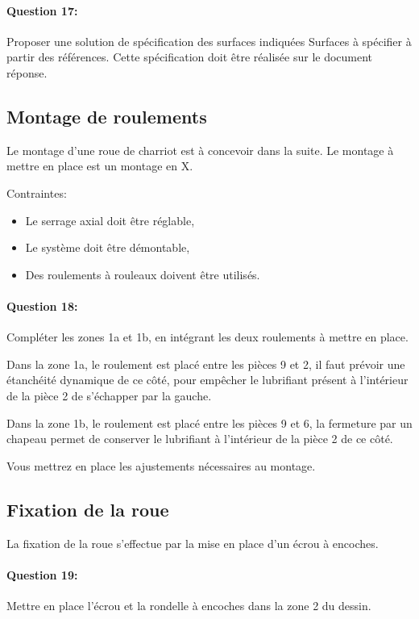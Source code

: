 \paragraph{Question 17:} Proposer une solution de spécification des surfaces indiquées \og Surfaces à spécifier \fg à partir des références. Cette spécification doit être réalisée sur le document réponse.

\subsection{Montage de roulements}
 
Le montage d'une roue de charriot est à concevoir dans la suite. Le montage à mettre en place est un montage en X.

Contraintes:\\
\begin{itemize}
 \item Le serrage axial doit être réglable,
 \item Le système doit être démontable,
 \item Des roulements à rouleaux doivent être utilisés.
\end{itemize}

\paragraph{Question 18:} Compléter les zones 1a et 1b, en intégrant les deux roulements à mettre en place.

Dans la zone 1a, le roulement est placé entre les pièces 9 et 2, il faut prévoir une étanchéité dynamique de ce côté, pour empêcher le lubrifiant présent à l'intérieur de la pièce 2 de s'échapper par la gauche.

Dans la zone 1b, le roulement est placé entre les pièces 9 et 6, la fermeture par un chapeau permet de conserver le lubrifiant à l'intérieur de la pièce 2 de ce côté.

Vous mettrez en place les ajustements nécessaires au montage.

\subsection{Fixation de la roue}

La fixation de la roue s'effectue par la mise en place d'un écrou à encoches.

\paragraph{Question 19:} Mettre en place l'écrou et la rondelle à encoches dans la zone 2 du dessin.

